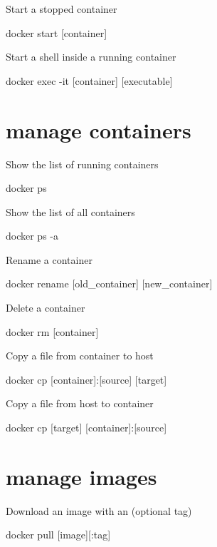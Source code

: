 \documentclass{refcard}
\begin{document}
Start a stopped container
\begin{ttyenv}
docker start [container]
\end{ttyenv}

Start a shell inside a running container
\begin{ttyenv}
docker exec -it [container] [executable]
\end{ttyenv}


\section{manage containers}

Show the list of running containers
\begin{ttyenv}
docker ps
\end{ttyenv}

Show the list of all containers
\begin{ttyenv}
docker ps -a
\end{ttyenv}

Rename a container
\begin{ttyenv}
docker rename [old_container] [new_container]
\end{ttyenv}

Delete a container
\begin{ttyenv}
docker rm [container]
\end{ttyenv}

Copy a file from container to host
\begin{ttyenv}
docker cp [container]:[source] [target]
\end{ttyenv}

Copy a file from host to container
\begin{ttyenv}
docker cp [target] [container]:[source] 
\end{ttyenv}
\vspace{4em}


\section{manage images}

Download an image with an (optional tag)
\begin{ttyenv}
docker pull [image][:tag]
\end{ttyenv}
\end{document}
